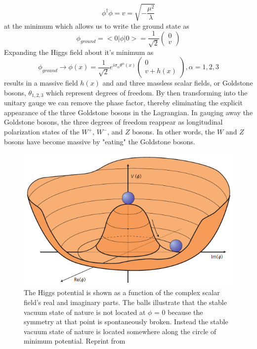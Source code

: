 \begin{equation}
	\phi^\dagger \phi = v = \sqrt{-\frac{\mu^2}{\lambda}}
\end{equation}
at the minimum which allows us to write the ground state as
\begin{equation}
	\phi_{ground} = <0|\phi|0> = 
	\frac{1}{\sqrt{2}}
	\left(
	\begin{array}{c}
		0 \\
		v
	\end{array}
	\right)
\end{equation}
Expanding the Higgs field about it's minimum as 
\begin{equation}
	\phi_{ground} \rightarrow \phi(x) = \frac{1}{\sqrt{2}}e^{i\sigma_\alpha \theta^\alpha (x)}
	\left(
	\begin{array}{c}
		0 \\
		v + h(x)
	\end{array}
	\right), \alpha= 1,2,3
\end{equation}
results in a massive field $h(x)$ and and three massless scalar fields, or Goldstone bosons, $\theta_{1,2,3}$ which represent degrees of freedom.  By then transforming into the unitary gauge we can remove the phase factor, thereby eliminating the explicit appearance of the three Goldstone bosons in the Lagrangian.  In gauging away the Goldstone bosons, the three degrees of freedom reappear as longitudinal polarization states of the $W^+$, $W^-$, and $Z$ bosons.  In other words, the $W$ and $Z$ bosons have become massive by "eating" the Goldstone bosons.

\begin{figure}[h]
	\centering
	\includegraphics[width=0.7\linewidth]{Figures/higgspotential}
	\caption[Illustration of the Higgs potential for $\mu^2$ < 0]{The Higgs potential is shown as a function of the complex scalar field's real and imaginary parts. The balls illustrate that the stable vacuum state of nature is not located at $\phi$ = 0 because the symmetry at that point is spontaneously broken. Instead the stable vacuum state of nature is located somewhere along the circle of minimum potential. Reprint from \cite{Ellis:2011}}
	\label{fig:higgspotential}
\end{figure}


